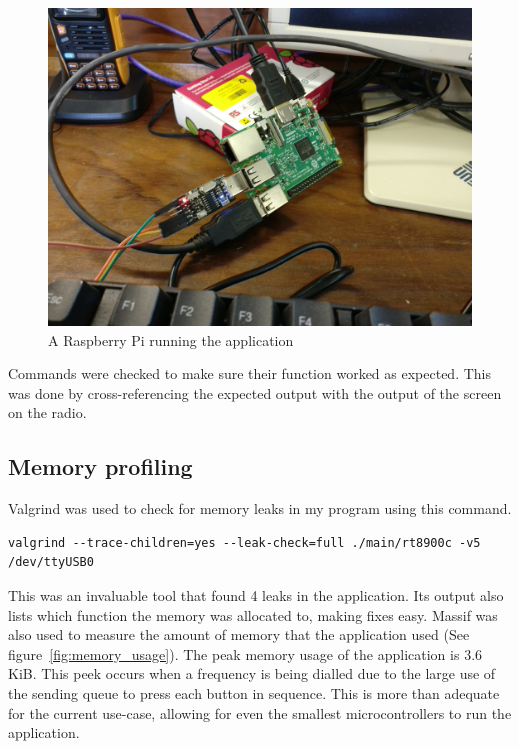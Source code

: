 \begin{figure}[!h]
    \centering
    \includegraphics{img/raspberry_pi.jpg}
    \caption{A Raspberry Pi running the application}
    \label{fig:raspberry_pi}
\end{figure}

Commands were checked to make sure their function worked as expected. This was done by cross-referencing the expected output with the output of the screen on the radio.

\subsection{Memory profiling}
Valgrind\cite{valgrind} was used to check for memory leaks in my program using this command.
\begin{verbatim}
valgrind --trace-children=yes --leak-check=full ./main/rt8900c -v5 /dev/ttyUSB0 
\end{verbatim}

This was an invaluable tool that found 4 leaks in the application. Its output also lists which function the memory was allocated to, making fixes easy. Massif was also used to measure the amount of memory that the application used (See figure~\ref{fig:memory_usage}). The peak memory usage of the application is 3.6 KiB. This peek occurs when a frequency is being dialled due to the large use of the sending queue to press each button in sequence. This is more than adequate for the current use-case, allowing for even the smallest microcontrollers to run the application.

